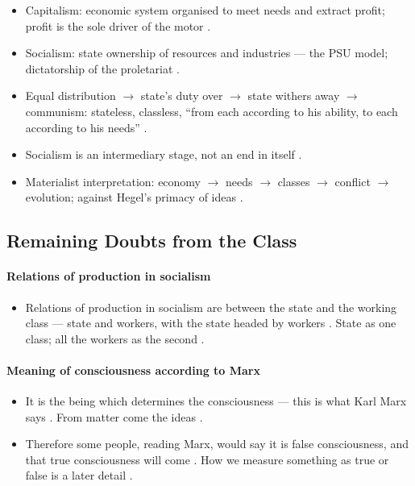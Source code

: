 \begin{QuickRevision}
\begin{itemize}
    \item Capitalism: economic system organised to meet needs and extract profit; profit is the sole driver of the motor .
    \item Socialism: state ownership of resources and industries --- the PSU model; dictatorship of the proletariat .
    \item Equal distribution $\rightarrow$ state's duty over $\rightarrow$ state withers away $\rightarrow$ communism: stateless, classless, ``from each according to his ability, to each according to his needs'' .
    \item Socialism is an intermediary stage, not an end in itself .
    \item Materialist interpretation: economy $\rightarrow$ needs $\rightarrow$ classes $\rightarrow$ conflict $\rightarrow$ evolution; against Hegel's primacy of ideas .
\end{itemize}
\end{QuickRevision}

\subsection{Remaining Doubts from the Class}

\paragraph{Relations of production in socialism}
\begin{itemize}
    \item Relations of production in socialism are between the state and the working class --- state and workers, with the state headed by workers . State as one class; all the workers as the second .
\end{itemize}

\paragraph{Meaning of consciousness according to Marx}
\begin{itemize}
    \item It is the being which determines the consciousness --- this is what Karl Marx says . From matter come the ideas .
    \item Therefore some people, reading Marx, would say it is false consciousness, and that true consciousness will come . How we measure something as true or false is a later detail .
\end{itemize}


